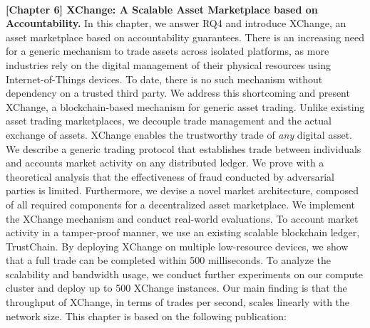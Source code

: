 \\

\textbf{[Chapter 6] XChange: A Scalable Asset Marketplace based on Accountability.}
In this chapter, we answer RQ4 and introduce XChange, an asset marketplace based on accountability guarantees.
There is an increasing need for a generic mechanism to trade assets across isolated platforms, as more industries rely on the digital management of their physical resources using Internet-of-Things devices.
To date, there is no such mechanism without dependency on a trusted third party.
We address this shortcoming and present XChange, a blockchain-based mechanism for generic asset trading.
Unlike existing asset trading marketplaces, we decouple trade management and the actual exchange of assets.
XChange enables the trustworthy trade of \emph{any} digital asset.
We describe a generic trading protocol that establishes trade between individuals and accounts market activity on any distributed ledger.
We prove with a theoretical analysis that the effectiveness of fraud conducted by adversarial parties is limited.
Furthermore, we devise a novel market architecture, composed of all required components for a decentralized asset marketplace.
We implement the XChange mechanism and conduct real-world evaluations.
To account market activity in a tamper-proof manner, we use an existing scalable blockchain ledger, TrustChain.
By deploying XChange on multiple low-resource devices, we show that a full trade can be completed within 500 milliseconds.
To analyze the scalability and bandwidth usage, we conduct further experiments on our compute cluster and deploy up to 500 XChange instances.
Our main finding is that the throughput of XChange, in terms of trades per second, scales linearly with the network size.
This chapter is based on the following publication:

\\

